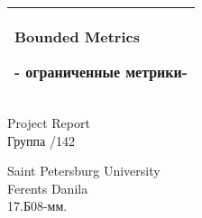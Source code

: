 \begin{titlepage}
  \addtolength{\hoffset}{0.5\evensidemargin-0.5\oddsidemargin}   
  \noindent
  \begin{tabular}{@{}p{\textwidth}@{}}
    \toprule[2pt]
    \midrule
    \vspace{0.2cm}
    \begin{center}
    \Huge{\textbf{
      Bounded Metrics
    }}
    \end{center}
    \begin{center}
      \Large{
        - ограниченные метрики-%
      }
    \end{center}
    \vspace{0.2cm}\\
    \midrule
    \toprule[2pt]
  \end{tabular}
  \vspace{4 cm}
  \begin{center}
    {\large
      Project Report
    }\\
    \vspace{0.2cm}
    {\Large
      Группа /142
    }
  \end{center}
  \vfill
  \begin{center}
  Saint Petersburg University\\
  Ferents Danila\\
  17.Б08-мм.
  \end{center}
\end{titlepage}
\clearpage
